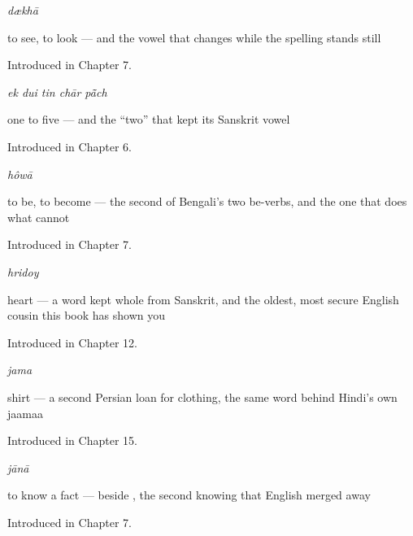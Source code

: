 \noindent\begin{minipage}[t]{\linewidth}
\raggedright
\textbf{}\enspace\emph{dækhā}\par
\small to see, to look — and the vowel that changes while the spelling stands still\par
\footnotesize Introduced in Chapter 7.
\end{minipage}\par\medskip

\noindent\begin{minipage}[t]{\linewidth}
\raggedright
\textbf{    }\enspace\emph{ek dui tin chār pā̃ch}\par
\small one to five — and the \textquotedblleft{}two\textquotedblright{} that kept its Sanskrit vowel\par
\footnotesize Introduced in Chapter 6.
\end{minipage}\par\medskip

\noindent\begin{minipage}[t]{\linewidth}
\raggedright
\textbf{}\enspace\emph{hôwā}\par
\small to be, to become — the second of Bengali's two be-verbs, and the one that does what  cannot\par
\footnotesize Introduced in Chapter 7.
\end{minipage}\par\medskip

\noindent\begin{minipage}[t]{\linewidth}
\raggedright
\textbf{}\enspace\emph{hridoy}\par
\small heart — a word kept whole from Sanskrit, and the oldest, most secure English cousin this book has shown you\par
\footnotesize Introduced in Chapter 12.
\end{minipage}\par\medskip

\noindent\begin{minipage}[t]{\linewidth}
\raggedright
\textbf{}\enspace\emph{jama}\par
\small shirt — a second Persian loan for clothing, the same word behind Hindi's own jaamaa\par
\footnotesize Introduced in Chapter 15.
\end{minipage}\par\medskip

\noindent\begin{minipage}[t]{\linewidth}
\raggedright
\textbf{}\enspace\emph{jānā}\par
\small to know a fact — beside , the second knowing that English merged away\par
\footnotesize Introduced in Chapter 7.
\end{minipage}\par\medskip

